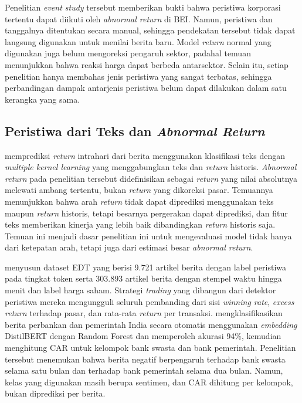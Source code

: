 Penelitian \emph{event study} tersebut memberikan bukti bahwa peristiwa korporasi tertentu dapat diikuti oleh \emph{abnormal return} di BEI. Namun, peristiwa dan tanggalnya ditentukan secara manual, sehingga pendekatan tersebut tidak dapat langsung digunakan untuk menilai berita baru. Model \emph{return} normal yang digunakan juga belum mengoreksi pengaruh sektor, padahal temuan \textcite{fauzi2021} menunjukkan bahwa reaksi harga dapat berbeda antarsektor. Selain itu, setiap penelitian hanya membahas jenis peristiwa yang sangat terbatas, sehingga perbandingan dampak antarjenis peristiwa belum dapat dilakukan dalam satu kerangka yang sama.

\subsection{Peristiwa dari Teks dan \emph{Abnormal Return}}

\textcite{luss2015} memprediksi \emph{return} intrahari dari berita menggunakan klasifikasi teks dengan \emph{multiple kernel learning} yang menggabungkan teks dan \emph{return} historis. \emph{Abnormal return} pada penelitian tersebut didefinisikan sebagai \emph{return} yang nilai absolutnya melewati ambang tertentu, bukan \emph{return} yang dikoreksi pasar. Temuannya menunjukkan bahwa arah \emph{return} tidak dapat diprediksi menggunakan teks maupun \emph{return} historis, tetapi besarnya pergerakan dapat diprediksi, dan fitur teks memberikan kinerja yang lebih baik dibandingkan \emph{return} historis saja. Temuan ini menjadi dasar penelitian ini untuk mengevaluasi model tidak hanya dari ketepatan arah, tetapi juga dari estimasi besar \emph{abnormal return}.

\textcite{zhou2021} menyusun dataset EDT yang berisi 9.721 artikel berita dengan label peristiwa pada tingkat token serta 303.893 artikel berita dengan stempel waktu hingga menit dan label harga saham. Strategi \emph{trading} yang dibangun dari detektor peristiwa mereka mengungguli seluruh pembanding dari sisi \emph{winning rate}, \emph{excess return} terhadap pasar, dan rata-rata \emph{return} per transaksi. \textcite{dogra2022} mengklasifikasikan berita perbankan dan pemerintah India secara otomatis menggunakan \emph{embedding} DistilBERT dengan Random Forest dan memperoleh akurasi 94\%, kemudian menghitung CAR untuk kelompok bank swasta dan bank pemerintah. Penelitian tersebut menemukan bahwa berita negatif berpengaruh terhadap bank swasta selama satu bulan dan terhadap bank pemerintah selama dua bulan. Namun, kelas yang digunakan masih berupa sentimen, dan CAR dihitung per kelompok, bukan diprediksi per berita.

